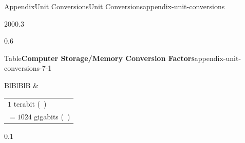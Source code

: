 \documentclass[twoside,10pt,]{book}
\makeatletter
\newcommand{\xreffont}{\relax}
\numberwithin{equation}{section}
\newcommand{\hrulethick} {\noalign{\hrule height 0.11em}}
\newcommand{\tablecelllines}[3]%
{\begin{tabular}[#2]{@{}#1@{}}#3\end{tabular}}
\providecommand\phantomsection{}
\makeatother
\begin{document}
\begin{appendixptx}{Appendix}{Unit Conversions}{}{Unit Conversions}{}{}{appendix-unit-conversions}
\begin{sidebyside}{2}{0}{0}{0.3}
\begin{sbspanel}{0.6}
\begin{paneltableptx}{Table}{\textbf{Computer Storage\slash{}Memory Conversion Factors}}{appendix-unit-conversions-7-1}{}
{{{\begin{tabular}{BlBlBlB}
&\tablecelllines{l}{m}
{\(1\) terabit (\si{\tera\bit})\\
\({}=1024\) gigabits (\si{\giga\bit})}
\tabularnewline\hrulethick
\end{tabular}
}%
\par}
}%
\tcblower
\end{paneltableptx}%
\end{sbspanel}%
\begin{sbspanel}{0.1}%
%
\end{sbspanel}%
\end{sidebyside}%
\end{appendixptx}
%
\backmatter%
%
\clearpage\phantomsection%
%
%
{\xreffont\printindex}
%
\end{document}
